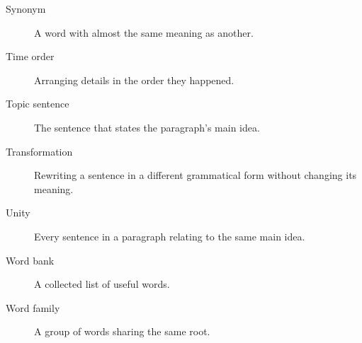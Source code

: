 \begin{description}
    \item[Synonym] A word with almost the same meaning as another.

    \item[Time order] Arranging details in the order they happened.

    \item[Topic sentence] The sentence that states the paragraph's main idea.

    \item[Transformation] Rewriting a sentence in a different grammatical form without changing its meaning.

    \item[Unity] Every sentence in a paragraph relating to the same main idea.

    \item[Word bank] A collected list of useful words.

    \item[Word family] A group of words sharing the same root.

\end{description}